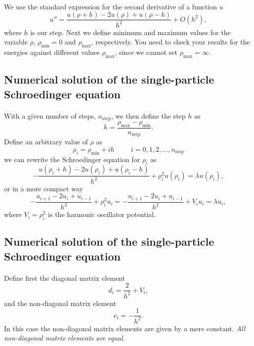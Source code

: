 \documentclass[%
twoside,                 %
final,                   %
10pt]{article}
\begin{document}
\paragraph{}
We use the standard
expression for the second derivative of a function $u$
\begin{equation}
    u''=\frac{u(\rho+h) -2u(\rho) +u(\rho-h)}{h^2} +O(h^2),
    \label{eq:diffoperation}
\end{equation} 
where $h$ is our step.
Next we define minimum and maximum values for the variable $\rho$,
$\rho_{\mathrm{min}}=0$  and $\rho_{\mathrm{max}}$, respectively.
You need to check your results for the energies against different values
$\rho_{\mathrm{max}}$, since we cannot set
$\rho_{\mathrm{max}}=\infty$.




\subsection*{Numerical solution of the single-particle Schroedinger equation}

\paragraph{}
With a given number of steps, $n_{\mathrm{step}}$, we then 
define the step $h$ as
\[
  h=\frac{\rho_{\mathrm{max}}-\rho_{\mathrm{min}} }{n_{\mathrm{step}}}.
\]
Define an arbitrary value of $\rho$ as 
\[
    \rho_i= \rho_{\mathrm{min}} + ih \hspace{1cm} i=0,1,2,\dots , n_{\mathrm{step}}
\]
we can rewrite the Schroedinger equation for $\rho_i$ as
\[
-\frac{u(\rho_i+h) -2u(\rho_i) +u(\rho_i-h)}{h^2}+\rho_i^2u(\rho_i)  = \lambda u(\rho_i),
\]
or in  a more compact way
\[
-\frac{u_{i+1} -2u_i +u_{i-1}}{h^2}+\rho_i^2u_i=-\frac{u_{i+1} -2u_i +u_{i-1} }{h^2}+V_iu_i  = \lambda u_i,
\]
where $V_i=\rho_i^2$ is the harmonic oscillator potential.




\subsection*{Numerical solution of the single-particle Schroedinger equation}

\paragraph{}
Define first the diagonal matrix element
\[
   d_i=\frac{2}{h^2}+V_i,
\]
and the non-diagonal matrix element 
\[
   e_i=-\frac{1}{h^2}.
\]
In this case the non-diagonal matrix elements are given by a mere constant. \emph{All non-diagonal matrix elements are equal}.
\end{document}
